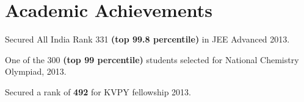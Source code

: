 \section{Academic Achievements}
\begin{tightitemize}
\item{Secured All India Rank 331 \textbf{(top 99.8 percentile)} in JEE Advanced 2013.}
\item {One of the 300 \textbf{(top 99 percentile)} students selected for National Chemistry Olympiad, 2013.}
\item{Secured a rank of \textbf{492} for KVPY fellowship 2013.}
\end{tightitemize}
